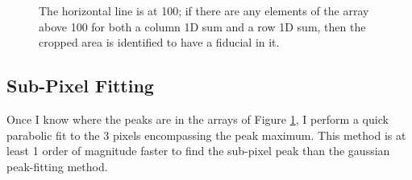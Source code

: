 \documentclass[10pt]{scrartcl}
\begin{document}
\begin{figure}[!ht]
\begin{subfigure}[b]{.3\linewidth}
    \end{subfigure}
    \caption{The horizontal line is at 100; if there are any elements of the array above 100 for both a column 1D sum and a row 1D sum, then the cropped area is identified to have a fiducial in it.}
    \label{lotsofplot}
\end{figure}

\subsection{Sub-Pixel Fitting} %
\label{sub:sub_pixel_fitting}
Once I know where the peaks are in the arrays of Figure \ref{lotsofplot}, I perform a quick parabolic fit to the 3 pixels encompassing the peak maximum. This method is at least 1 order of magnitude faster to find the sub-pixel peak than the gaussian peak-fitting method. 




\end{document}
